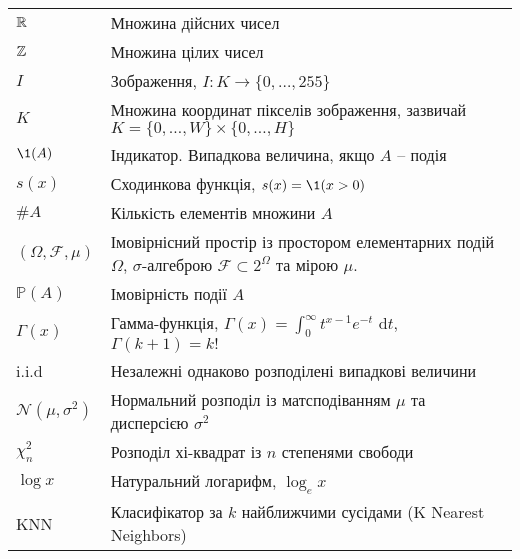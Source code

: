 


\begin{tabular}{l p{12cm}}

    $\mathbb R$ & Множина дійсних чисел\\
    $\mathbb Z$ & Множина цілих чисел\\
    $I$ & Зображення, $I \colon K \to \{0,\dots ,255\}$ \\
    $K$ & Множина координат пікселів зображення, зазвичай $K = \{0,\dots ,W\} \times \{0,\dots ,H\}$\\
    $\1(A)$ & Індикатор. Випадкова величина, якщо $A$ -- подія\\
    $s(x)$ & Сходинкова функція, $s(x) = \1(x > 0)$\\
    $\# A$ & Кількість елементів множини $A$\\
    $(\Omega, \mathcal F, \mu)$ & Імовірнісний простір із простором елементарних подій~$\Omega$, $\sigma$-алгеброю $\mathcal F \subset 2^\Omega$ та мірою $\mu$.\\
    $\mathbb P(A)$ & Імовірність події $A$\\
    $\Gamma(x)$ & Гамма-функція, $\Gamma (x)=\int _{0}^{\infty }t^{x-1}e^{-t}{\text{ d}}t$, $\Gamma(k+1) = k!$\\
    i.i.d & Незалежні однаково розподілені випадкові величини \\
    $\mathcal N(\mu, \sigma^2)$ & Нормальний розподіл із матсподіванням $\mu$ та дисперсією $\sigma^2$ \\
    $\chi^2_n$ & Розподіл хі-квадрат із $n$ степенями свободи \\
    $\log x$ & Натуральний логарифм, $\log_e x$ \\
    KNN & Класифікатор за $k$ найближчими сусідами (K Nearest Neighbors) 


\end{tabular}
